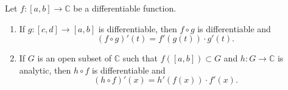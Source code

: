 Let $f: [a, b] \to \mathbb{C}$ be a differentiable function.

\begin{enumerate}
\item[(a)] If $g: [c, d] \to [a, b]$ is differentiable, then $f \circ g$ is differentiable and
$$(f \circ g)'(t) = f'(g(t)) \cdot g'(t).$$

\item[(b)] If $G$ is an open subset of $\mathbb{C}$ such that $f([a, b]) \subset G$ and $h: G \to \mathbb{C}$ is analytic, then $h \circ f$ is differentiable and
$$(h \circ f)'(x) = h'(f(x)) \cdot f'(x).$$
\end{enumerate}
